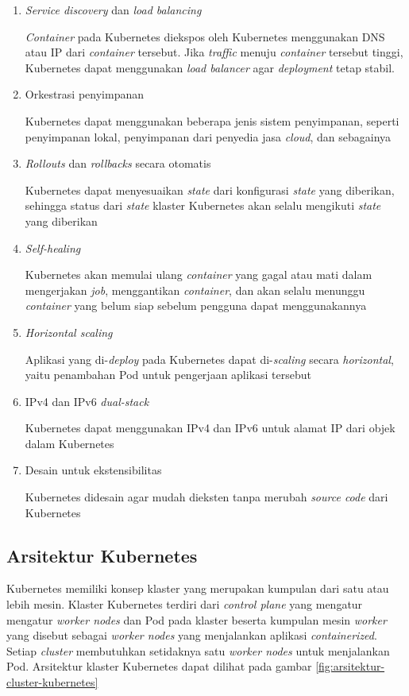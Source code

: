 \begin{enumerate}
  \item{\emph{Service discovery} dan \emph{load balancing}}
    \par{\emph{Container} pada Kubernetes diekspos oleh Kubernetes menggunakan DNS atau IP dari
      \emph{container} tersebut. Jika \emph{traffic} menuju \emph{container} tersebut tinggi, Kubernetes
      dapat menggunakan \emph{load balancer} agar \emph{deployment} tetap stabil.
    }
  \item{Orkestrasi penyimpanan}
    \par{Kubernetes dapat menggunakan beberapa jenis sistem penyimpanan, seperti
      penyimpanan lokal, penyimpanan dari penyedia jasa \emph{cloud}, dan sebagainya
    }
  \item{\emph{Rollouts} dan \emph{rollbacks} secara otomatis}
    \par{Kubernetes dapat menyesuaikan \emph{state} dari konfigurasi \emph{state} yang
      diberikan, sehingga status dari \emph{state} klaster Kubernetes akan selalu mengikuti
      \emph{state} yang diberikan
    }
  \item{\emph{Self-healing}}
    \par{Kubernetes akan memulai ulang \emph{container} yang gagal atau mati dalam
      mengerjakan \emph{job}, menggantikan \emph{container}, dan akan selalu menunggu
      \emph{container} yang belum siap sebelum pengguna dapat menggunakannya
    }
  \item{\emph{Horizontal scaling}}
    \par{Aplikasi yang di-\emph{deploy} pada Kubernetes dapat di-\emph{scaling} secara
      \emph{horizontal}, yaitu penambahan Pod untuk pengerjaan aplikasi tersebut
    }
  \item{IPv4 dan IPv6 \emph{dual-stack}}
    \par{Kubernetes dapat menggunakan IPv4 dan IPv6 untuk alamat IP dari objek dalam Kubernetes
    }
  \item{Desain untuk ekstensibilitas}
    \par{Kubernetes didesain agar mudah dieksten tanpa merubah \emph{source code} dari Kubernetes
    }
\end{enumerate}

\subsection{Arsitektur Kubernetes}

Kubernetes memiliki konsep klaster yang merupakan kumpulan dari satu atau
lebih mesin. Klaster Kubernetes terdiri dari \emph{control plane} yang mengatur
mengatur \emph{worker nodes} dan Pod pada klaster
beserta kumpulan mesin \emph{worker} yang disebut sebagai \emph{worker nodes} yang 
menjalankan aplikasi \emph{containerized}. Setiap \emph{cluster} membutuhkan
setidaknya satu \emph{worker nodes} untuk menjalankan Pod. Arsitektur
klaster Kubernetes dapat dilihat pada gambar \ref{fig:arsitektur-cluster-kubernetes}

